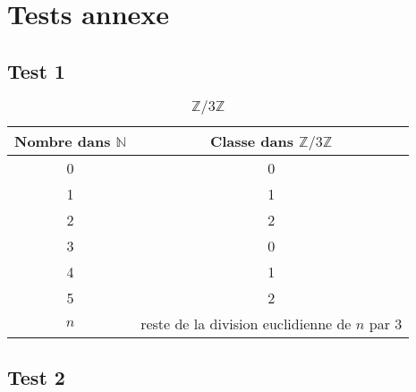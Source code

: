\section{Tests annexe}
\subsection{Test 1}
\begin{table}[h]
	\centering
	\begin{tabular}{|c | c|}
		\hline \textbf{Nombre dans $\mathbb{N}$} & \textbf{Classe dans $\mathbb{Z}/3\mathbb{Z}$} \\
		\hline 0 & 0 \\
	        \hline 1 & 1 \\
		\hline 2 & 2 \\
		\hline 3 & 0 \\
		\hline 4 & 1 \\
		\hline 5 & 2 \\
		\hline $n$ & reste de la division euclidienne de $n$ par 3 \\
		\hline
	\end{tabular}
	\caption{$\mathbb{Z}/3\mathbb{Z}$}
\end{table}
\subsection{Test 2}
